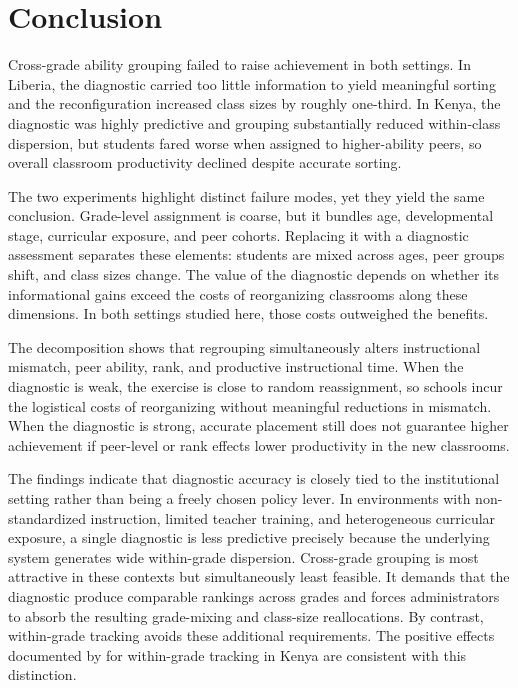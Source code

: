\documentclass[11pt]{article}
\begin{document}
\section{Conclusion}
\label{sec:conclusion}

Cross-grade ability grouping failed to raise achievement in both settings. In Liberia, the diagnostic carried too little information to yield meaningful sorting and the reconfiguration increased class sizes by roughly one-third. In Kenya, the diagnostic was highly predictive and grouping substantially reduced within-class dispersion, but students fared worse when assigned to higher-ability peers, so overall classroom productivity declined despite accurate sorting.

The two experiments highlight distinct failure modes, yet they yield the same conclusion. Grade-level assignment is coarse, but it bundles age, developmental stage, curricular exposure, and peer cohorts. Replacing it with a diagnostic assessment separates these elements: students are mixed across ages, peer groups shift, and class sizes change. The value of the diagnostic depends on whether its informational gains exceed the costs of reorganizing classrooms along these dimensions. In both settings studied here, those costs outweighed the benefits.

The decomposition shows that regrouping simultaneously alters instructional mismatch, peer ability, rank, and productive instructional time. When the diagnostic is weak, the exercise is close to random reassignment, so schools incur the logistical costs of reorganizing without meaningful reductions in mismatch. When the diagnostic is strong, accurate placement still does not guarantee higher achievement if peer-level or rank effects lower productivity in the new classrooms.

The findings indicate that diagnostic accuracy is closely tied to the institutional setting rather than being a freely chosen policy lever. In environments with non-standardized instruction, limited teacher training, and heterogeneous curricular exposure, a single diagnostic is less predictive precisely because the underlying system generates wide within-grade dispersion. Cross-grade grouping is most attractive in these contexts but simultaneously least feasible. It demands that the diagnostic produce comparable rankings across grades and forces administrators to absorb the resulting grade-mixing and class-size reallocations. By contrast, within-grade tracking avoids these additional requirements. The positive effects documented by \citet{duflo2011peer} for within-grade tracking in Kenya are consistent with this distinction.
\end{document}
